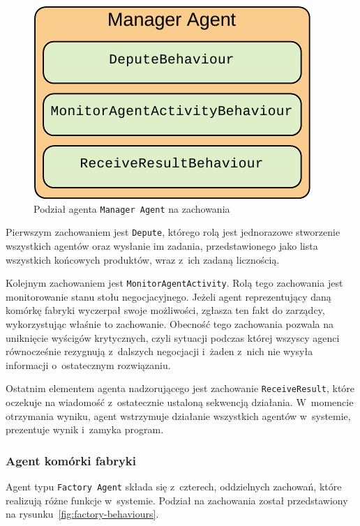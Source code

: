 \begin{figure}[h]
    \centering
    \includegraphics[width=0.8\columnwidth]{figures/SAG-Manager-Behaviours.pdf}
    \caption{Podział agenta \texttt{Manager Agent} na zachowania}
    \label{fig:manager-behaviours}
\end{figure}

Pierwszym zachowaniem jest \texttt{Depute}, którego rolą jest jednorazowe stworzenie wszystkich agentów oraz wysłanie im zadania, przedstawionego jako lista wszystkich końcowych produktów, wraz z~ich zadaną licznością.

Kolejnym zachowaniem jest \texttt{MonitorAgentActivity}. Rolą tego zachowania jest monitorowanie stanu stołu negocjacyjnego. Jeżeli agent reprezentujący daną komórkę fabryki wyczerpał swoje możliwości, zgłasza ten fakt do zarządcy, wykorzystując właśnie to zachowanie. Obecność tego zachowania pozwala na uniknięcie wyścigów krytycznych, czyli sytuacji podczas której wszyscy agenci równocześnie rezygnują z~dalszych negocjacji i~żaden z~nich nie wysyła informacji o~ostatecznym rozwiązaniu.

Ostatnim elementem agenta nadzorującego jest zachowanie \texttt{ReceiveResult}, które oczekuje na wiadomość z~ostatecznie ustaloną sekwencją działania. W~momencie otrzymania wyniku, agent wstrzymuje działanie wszystkich agentów w~systemie, prezentuje wynik i~zamyka program. 

\subsubsection{Agent komórki fabryki}
Agent typu \texttt{Factory Agent} składa się z~czterech, oddzielnych zachowań, które realizują różne funkcje w~systemie. Podział na zachowania został przedstawiony na rysunku~\ref{fig:factory-behaviours}.

